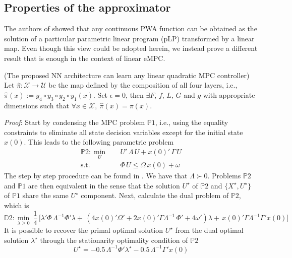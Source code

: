 \subsection{Properties of the approximator}

The authors of \cite{hempel2013every} showed that any continuous PWA function can be obtained as the solution of a particular parametric linear program (pLP) transformed by a linear map. Even though this view could be adopted herein, we instead prove a different result that is enough in the context of linear eMPC.

\begin{theorem}
	(The proposed NN architecture can learn any linear quadratic MPC controller) Let $\hat{\pi}: \mathcal{X} \rightarrow \mathcal{U}$ be the map defined by the composition of all four layers, i.e., $\hat{\pi}(x) := y_4 \circ y_3 \circ y_2 \circ y_1(x)$. Set $\epsilon = 0$, then $\exists F$, $f$, $L$, $G$ and $g$ with appropriate dimensions such that $\forall x \in \mathcal{X}, \ \hat{\pi}(x) = \pi(x)$.
\end{theorem}

\textit{Proof}: Start by condensing the MPC problem $\mathds{P}1$, i.e., using the equality constraints to eliminate all state decision variables except for the initial state $x(0)$. This leads to the following parametric problem
\begin{subequations}
	\begin{align}
		\mathds{P}2: \min_{U} \quad & U' \, \Lambda \, U + x(0)' \, \Gamma \, U\\
		\text{s.t.} \quad & \Phi \, U \leq  \Omega \, x(0) + \omega \label{eq:constr}
	\end{align}
\end{subequations}
The step by step procedure can be found in \cite{wright2019efficient}. We have that $\Lambda \succ 0$. Problems $\mathds{P}2$ and $\mathds{P}1$ are then equivalent in the sense that the solution $U^\star$ of $\mathds{P}2$ and $\{X^\star,U^\star\}$ of $\mathds{P}1$ share the same $U^\star$ component. Next, calculate the dual problem of $\mathds{P}2$, which is
\begin{equation}
		\label{eq:dualMPC}
		\mathds{D}2: \min_{\lambda \geq 0} \ \frac{1}{4} \, \big[ \lambda'\Phi \, \Lambda^{-1}\Phi'\lambda + \, (4 x(0)'\Omega' +2 x(0)'\Gamma \Lambda^{-1} \, \Phi' + 4 \omega')\lambda + \, x(0)'\Gamma \Lambda^{-1} \Gamma'x(0) \big]
\end{equation}
It is possible to recover the primal optimal solution $U^\star$ from the dual optimal solution $\lambda^\star$ through the stationarity optimality condition of $\mathds{P}2$
\begin{equation}
	\label{eq:stationarity}
	U^\star = -0.5 \, \Lambda^{-1}\Phi' \lambda^{\star} -0.5 \, \Lambda^{-1} \Gamma'x(0)
\end{equation}

